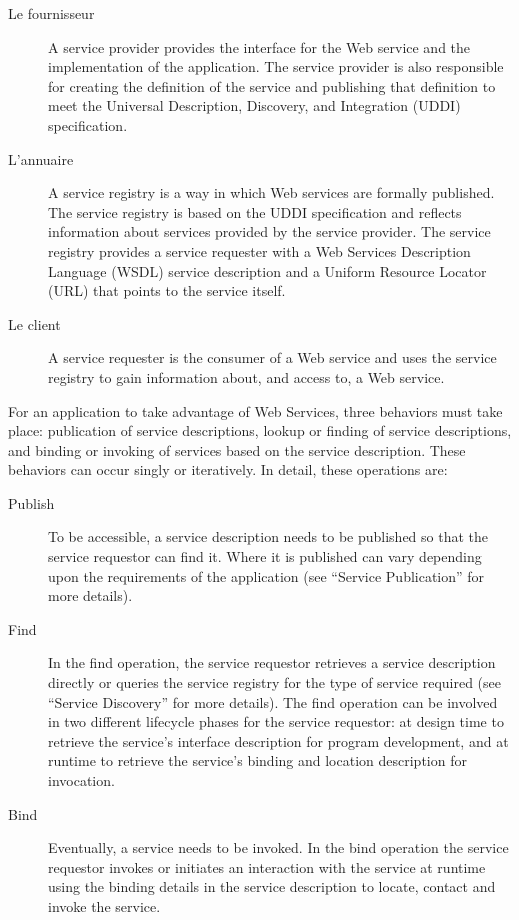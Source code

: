 	\SpecialItem
	\begin{description} %
	    \item[Le fournisseur]
		A service provider provides the interface for the Web service and the implementation of the
		application. The service provider is also responsible for creating the definition of the service and
		publishing that definition to meet the Universal Description, Discovery, and Integration (UDDI)
		specification.

	    \item[L'annuaire]
		A service registry is a way in which Web services are formally published. The service registry is based
		on the UDDI specification and reflects information about services provided by the service provider. The
		service registry provides a service requester with a Web Services Description Language (WSDL) service
		description and a Uniform Resource Locator (URL) that points to the service itself.

	    \item[Le client]
		A service requester is the consumer of a Web service and uses the service registry to gain information
		about, and access to, a Web service.

	\end{description}

	For an application to take advantage of Web Services, three behaviors must take place:
	publication of service descriptions, lookup or finding of service descriptions, and binding or
	invoking of services based on the service description. These behaviors can occur singly or
	iteratively. In detail, these operations are:
	\SpecialItem 
	\begin{description}%
	    \item[Publish]
		To be accessible, a service description needs to be published so that the
		service requestor can find it. Where it is published can vary depending upon the
		requirements of the application (see “Service Publication” for more details).

	    \item[Find]
		In the find operation, the service requestor retrieves a service description directly
		or queries the service registry for the type of service required (see “Service Discovery”
		for more details). The find operation can be involved in two different lifecycle phases for
		the service requestor: at design time to retrieve the service’s interface description for
		program development, and at runtime to retrieve the service’s binding and location
		description for invocation.

	    \item[Bind]
		Eventually, a service needs to be invoked. In the bind operation the service requestor invokes 
		or initiates an interaction with the service at runtime using the binding details in the service 
		description to locate, contact and invoke the service.  
	\end{description}

